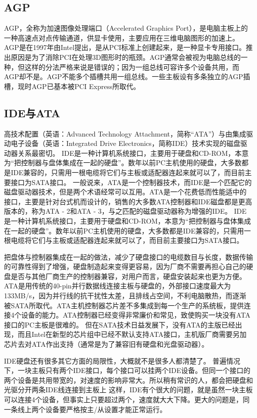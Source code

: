 \subsection{AGP}
AGP，全称为加速图像处理端口（Accelerated Graphics Port），是电脑主板上的一种高速点对点传输通道，供显卡使用，主要应用在三维电脑图形的加速上。AGP是在1997年由Intel提出，是从PCI标准上创建起来，是一种显卡专用接口。推出原因是为了消除PCI在处理3D图形时的瓶颈。AGP通常会被视为电脑总线的一种，但这样的分法严格来说是错误的；因为一组总线可容许多个设备共用，而AGP却不是。AGP不能多个插槽共用一组总线。一些主板设有多条独立的AGP插槽，现时AGP已基本被PCI Express所取代。


\subsection{IDE与ATA}
高技术配置（英语：Advanced Technology Attachment，简称“ATA”）与由集成驱动电子设备（英语：Integrated Drive Electronics，简称IDE）技术实现的磁盘驱动器关系最密切。
IDE是一种计算机系统接口，主要用于硬盘和CD-ROM，本意为“把控制器与盘体集成在一起的硬盘”。数年以前PC主机使用的硬盘，大多数都是IDE兼容的，只需用一根电缆将它们与主板或适配器连起来就可以了，而目前主要接口为SATA接口。
一般说来，ATA是一个控制器技术，而IDE是一个匹配它的磁盘驱动器技术，但是两个术语经常可以互用。ATA是一个花费低而性能适中的接口，主要是针对台式机而设计的，销售的大多数ATA控制器和IDE磁盘都是更高版本的，称为ATA - 2和ATA - 3，与之匹配的磁盘驱动器称为增强的IDE。
IDE是一种计算机系统接口，主要用于硬盘和CD-ROM，本意为“把控制器与盘体集成在一起的硬盘”。数年以前PC主机使用的硬盘，大多数都是IDE兼容的，只需用一根电缆将它们与主板或适配器连起来就可以了，而目前主要接口为SATA接口。

把盘体与控制器集成在一起的做法，减少了硬盘接口的电缆数目与长度，数据传输的可靠性得到了增强，硬盘制造起来变得更容易，因为厂商不需要再担心自己的硬盘是否与其他厂商生产的控制器兼容，对用户而言，硬盘安装起来也更为方便。
ATA是用传统的40-pin并行数据线连接主板与硬盘的，外部接口速度最大为133MB/s，因为并行线的抗干扰性太差，且排线占空间，不利电脑散热，而逐渐被SATA所取代。ATA主机控制器芯片差不多集成到每一个生产的系统板，提供连接4个设备的能力。ATA控制器已经变得非常廉价和常见，致使购买一块没有ATA接口的PC主板是很难的。
但在SATA技术日益发展下，没有ATA的主版已经出现，而且Intel在新型的芯片组中已经不默认支持ATA接口，主机版厂商需要另加芯片去对ATA作出支持（通常是为了兼容旧有硬盘和光盘驱动器）。

IDE硬盘还有很多其它方面的局限性，大概就不是很多人都清楚了。
普遍情况下，一块主板只有两个IDE接口，每个接口可以挂两个IDE设备。但同一个接口的两个设备是共用带宽的，对速度的影响非常大。所以稍有常识的人，都会把硬盘和光驱分开两条IDE线连接到主板上 
这样，IDE有个很大的问题，就是虽然一块主板可以连接4个设备，但事实上只要超过两个，速度就大大下降。更大的问题是，同一条线上两个设备要严格按主/从设置才能正常运行。

